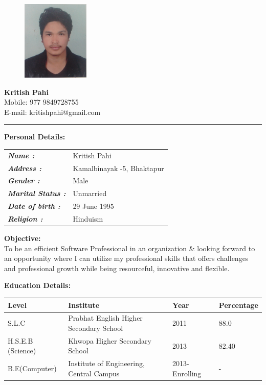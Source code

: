 \documentclass[a4paper, 12pt]{article}
\begin{document}
\pagestyle{empty}

\begin{figure}
	\includegraphics[height=1.5in]{k}
\end{figure}

\vspace{10mm}
{\Huge
	\textbf{Kritish Pahi} \\}
	\small{Mobile: 977 9849728755}\\
	\small{E-mail: kritishpahi@gmail.com}\\

	
\begin{figure}\end{figure}
 \rule[2pt]{\textwidth}{1pt}


{ \Large \textbf{Personal Details:}\\
}
\begin{tabular}{l l}
	 \textbf{\emph{Name :}} & Kritish Pahi \\
	 \textbf{\emph{Address :}}&  Kamalbinayak -5, Bhaktapur \\
	 \textbf{\emph{Gender :}} & Male \\
	 \textbf{\emph{Marital Status :}} & Unmarried \\ 
	 \textbf{\emph{Date of birth :}} & 29 June 1995 \\ 
	 \textbf{\emph{Religion :}} & Hinduism \\ 
\end{tabular}
\vspace{8mm}

{\Large \textbf{Objective:} \\ 
}
To be an efficient Software Professional in an organization \& looking forward
to an opportunity where I can utilize my professional skills that offers 
challenges and professional growth while being resourceful, innovative 
and flexible.

\vspace{8mm}
{\Large \textbf{ Education Details: } \\
}
\begin{tabular}{l l l l}
	\textbf{Level} & \textbf{Institute} &\textbf{Year} & \textbf{Percentage} \\ \hline
	S.L.C & Prabhat English Higher Secondary School & 2011 & 88.0 \\ \hline
	H.S.E.B (Science) & Khwopa Higher Secondary School & 2013 & 82.40 \\ \hline
	B.E(Computer) & Institute of Engineering, Central Campus & 2013-Enrolling & - \\ \hline
\end{tabular}
\end{document}
